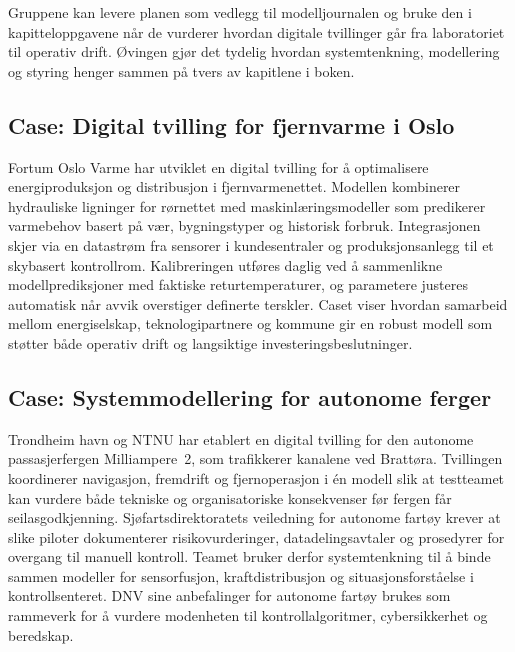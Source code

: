 Gruppene kan levere planen som vedlegg til modelljournalen og bruke den i kapitteloppgavene når de vurderer hvordan digitale tvillinger går fra laboratoriet til operativ drift. Øvingen gjør det tydelig hvordan systemtenkning, modellering og styring henger sammen på tvers av kapitlene i boken.

\subsection{Case: Digital tvilling for fjernvarme i Oslo}
Fortum Oslo Varme har utviklet en digital tvilling for å optimalisere energiproduksjon og distribusjon i fjernvarmenettet.
Modellen kombinerer hydrauliske ligninger for rørnettet med maskinlæringsmodeller som predikerer varmebehov basert på vær,
bygningstyper og historisk forbruk. Integrasjonen skjer via en datastrøm fra sensorer i kundesentraler og produksjonsanlegg til
et skybasert kontrollrom. Kalibreringen utføres daglig ved å sammenlikne modellprediksjoner med faktiske returtemperaturer, og
parametere justeres automatisk når avvik overstiger definerte terskler. Caset viser hvordan samarbeid mellom energiselskap,
teknologipartnere og kommune gir en robust modell som støtter både operativ drift og langsiktige investeringsbeslutninger.

\subsection{Case: Systemmodellering for autonome ferger}
Trondheim havn og NTNU har etablert en digital tvilling for den autonome passasjerfergen Milliampere~2, som trafikkerer kanalene
ved Brattøra.\citep{ntnu2023milliampere2} Tvillingen koordinerer navigasjon, fremdrift og fjernoperasjon i én modell slik at
testteamet kan vurdere både tekniske og organisatoriske konsekvenser før fergen får seilasgodkjenning. Sjøfartsdirektoratets
veiledning for autonome fartøy krever at slike piloter dokumenterer risikovurderinger, datadelingsavtaler og prosedyrer for
overgang til manuell kontroll.\citep{sdir2023autonomefartoy} Teamet bruker derfor systemtenkning til å binde sammen modeller for
sensorfusjon, kraftdistribusjon og situasjonsforståelse i kontrollsenteret. DNV sine anbefalinger for autonome fartøy brukes som
rammeverk for å vurdere modenheten til kontrollalgoritmer, cybersikkerhet og beredskap.\citep{dnv2024autonomous}

